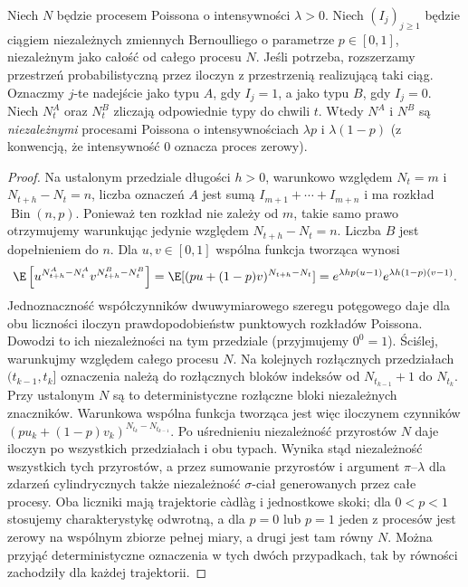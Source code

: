 \begin{twierdzenie}
Niech $N$ będzie procesem Poissona o intensywności $\lambda>0$.
Niech $(I_j)_{j\ge1}$ będzie ciągiem niezależnych
zmiennych Bernoulliego o parametrze $p\in[0,1]$,
niezależnym jako całość od całego procesu $N$.
Jeśli potrzeba, rozszerzamy przestrzeń probabilistyczną
przez iloczyn z przestrzenią realizującą taki ciąg.
Oznaczmy $j$-te nadejście jako typu $A$, gdy $I_j=1$,
a jako typu $B$, gdy $I_j=0$.
Niech $N_t^A$ oraz $N_t^B$ zliczają odpowiednie typy do chwili $t$.
Wtedy $N^A$ i $N^B$ są \emph{niezależnymi} procesami Poissona
o intensywnościach $\lambda p$ i $\lambda(1-p)$
(z konwencją, że intensywność $0$ oznacza proces zerowy).
\end{twierdzenie}
\begin{proof}
Na ustalonym przedziale długości $h>0$, warunkowo względem
$N_t=m$ i $N_{t+h}-N_t=n$, liczba oznaczeń $A$ jest sumą
$I_{m+1}+\cdots+I_{m+n}$ i ma rozkład
$\operatorname{Bin}(n,p)$. Ponieważ ten rozkład nie zależy
od $m$, takie samo prawo otrzymujemy warunkując jedynie
względem $N_{t+h}-N_t=n$. Liczba $B$ jest dopełnieniem do $n$.
Dla $u,v\in[0,1]$ wspólna funkcja tworząca wynosi
\[
\E\left[u^{N^A_{t+h}-N^A_t}v^{N^B_{t+h}-N^B_t}\right]
=\E[ (pu+(1-p)v)^{N_{t+h}-N_t}]
=e^{\lambda h p(u-1)}e^{\lambda h(1-p)(v-1)}.
\]
Jednoznaczność współczynników dwuwymiarowego szeregu
potęgowego daje dla obu liczności iloczyn prawdopodobieństw
punktowych rozkładów Poissona. Dowodzi to ich niezależności
na tym przedziale (przyjmujemy $0^0=1$).
Ściślej, warunkujmy względem całego procesu $N$.
Na kolejnych rozłącznych przedziałach $(t_{k-1},t_k]$
oznaczenia należą do rozłącznych bloków indeksów
od $N_{t_{k-1}}+1$ do $N_{t_k}$. Przy ustalonym $N$
są to deterministyczne rozłączne bloki niezależnych
znaczników. Warunkowa wspólna funkcja tworząca jest
więc iloczynem czynników
$(pu_k+(1-p)v_k)^{N_{t_k}-N_{t_{k-1}}}$.
Po uśrednieniu niezależność przyrostów $N$ daje
iloczyn po wszystkich przedziałach i obu typach.
Wynika stąd niezależność wszystkich tych przyrostów,
a przez sumowanie przyrostów i argument $\pi$--$\lambda$
dla zdarzeń cylindrycznych także niezależność
$\sigma$-ciał generowanych przez całe procesy.
Oba liczniki mają trajektorie c\`adl\`ag i jednostkowe
skoki; dla $0<p<1$ stosujemy charakterystykę odwrotną,
a dla $p=0$ lub $p=1$ jeden z procesów jest zerowy
na wspólnym zbiorze pełnej miary, a drugi jest tam
równy $N$. Można przyjąć deterministyczne oznaczenia
w tych dwóch przypadkach, tak by równości zachodziły
dla każdej trajektorii.
\end{proof}

